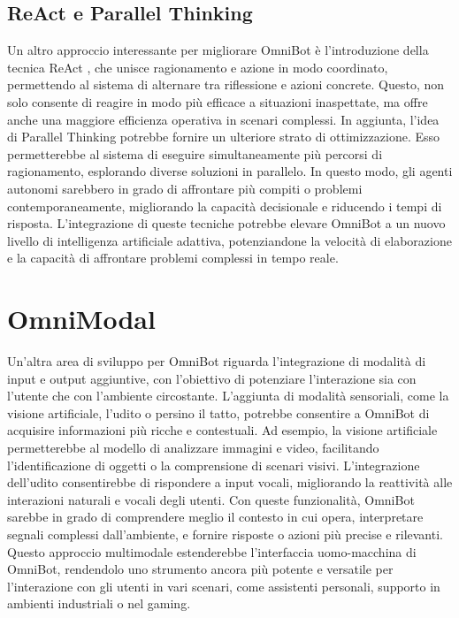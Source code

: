 \subsection{ReAct e Parallel Thinking}
Un altro approccio interessante per migliorare OmniBot è l'introduzione della tecnica ReAct \cite{yao2023reactsynergizingreasoningacting}, che unisce ragionamento e azione in modo coordinato, permettendo al sistema di alternare tra riflessione e azioni concrete. Questo, non solo consente di reagire in modo più efficace a situazioni inaspettate, ma offre anche una maggiore efficienza operativa in scenari complessi.
In aggiunta, l'idea di Parallel Thinking \cite{snell2024scalingllmtesttimecompute,10.1093/pnasnexus/pgae233} potrebbe fornire un ulteriore strato di ottimizzazione. Esso permetterebbe al sistema di eseguire simultaneamente più percorsi di ragionamento, esplorando diverse soluzioni in parallelo. In questo modo, gli agenti autonomi sarebbero in grado di affrontare più compiti o problemi contemporaneamente, migliorando la capacità decisionale e riducendo i tempi di risposta. L'integrazione di queste tecniche potrebbe elevare OmniBot a un nuovo livello di intelligenza artificiale adattiva, potenziandone la velocità di elaborazione e la capacità di affrontare problemi complessi in tempo reale.

\section{OmniModal}
Un'altra area di sviluppo per OmniBot riguarda l'integrazione di modalità di input e output aggiuntive, con l'obiettivo di potenziare l'interazione sia con l'utente che con l'ambiente circostante. L'aggiunta di modalità sensoriali, come la visione artificiale, l'udito o persino il tatto, potrebbe consentire a OmniBot di acquisire informazioni più ricche e contestuali. Ad esempio, la visione artificiale permetterebbe al modello di analizzare immagini e video, facilitando l'identificazione di oggetti o la comprensione di scenari visivi. L'integrazione dell'udito consentirebbe di rispondere a input vocali, migliorando la reattività alle interazioni naturali e vocali degli utenti.
Con queste funzionalità, OmniBot sarebbe in grado di comprendere meglio il contesto in cui opera, interpretare segnali complessi dall'ambiente, e fornire risposte o azioni più precise e rilevanti. Questo approccio multimodale estenderebbe l'interfaccia uomo-macchina di OmniBot, rendendolo uno strumento ancora più potente e versatile per l'interazione con gli utenti in vari scenari, come assistenti personali, supporto in ambienti industriali o nel gaming.

